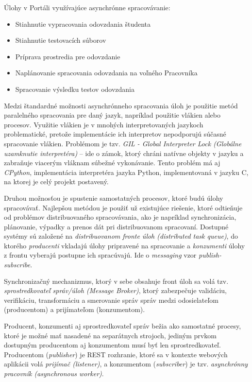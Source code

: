 \documentclass[
  digital, %
  oneside, %
  table,   %
  lof,     %
  lot,   %
]{fithesis3}
\begin{document}
Úlohy v Portáli využívajúce asynchrónne spracovávanie:

\begin{itemize}
    \item Stiahnutie vypracovania odovzdania študenta
    \item Stiahnutie testovacích súborov
    \item Príprava prostredia pre odovzdanie
    \item Naplánovanie spracovania odovzdania na voľného Pracovníka
    \item Spracovanie výsledku testov odovzdania
\end{itemize}

Medzi štandardné možnosti asynchrónneho spracovania úloh je použitie metód paralelného spracovania pre daný jazyk, napríklad použitie vlákien alebo procesov. Využitie vlákien je v mnohých interpretovaných jazykoch problematické, pretože implementácie ich interpretov nepodporujú súčasné spracovanie vlákien. Problémom je tzv. \emph{GIL - Global Interpreter Lock (Globálne uzamknutie interpretéra)} -- ide o zámok, ktorý chráni natívne objekty v jazyku a zabraňuje viacerým vláknam súbežné vykonávanie. Tento problém má aj \emph{CPython}, implementácia interpretéra jazyka Python, implementovaná v jazyku C, na ktorej je celý projekt postavený\cite{cpython-gil}.

Druhou možnosťou je spustenie samostatných procesov, ktoré budú úlohy spracovávať. Najlepšou metódou je použiť už existujúce riešenie, ktoré odtieňuje od problémov distribuovaného spracovávania, ako je napríklad synchronizácia, plánovanie, výpadky a prenos dát pri distribuovanom spracovaní. Dostupné systémy sú založené na \emph{distribuovanom fronte úloh (distributed task queue)}, do ktorého \emph{producenti} vkladajú úlohy pripravené na spracovanie a \emph{konzumenti} úlohy z frontu vyberajú postupne ich spracúvajú. Ide o \emph{messaging} vzor \emph{publish-subscribe}\cite{ethomas-soa}.

Synchronizačný mechanizmus, ktorý v sebe obsahuje front úloh sa volá tzv. \emph{sprostredkovateľ správ/úloh (Message Broker)}, ktorý zabezpečuje validáciu, verifikáciu, transformáciu a smerovanie správ správ medzi odosielateľom (producentom) a prijímateľom (konzumentom)\cite{mom}.

Producent, konzumenti aj sprostredkovateľ správ bežia ako samostatné procesy, ktoré je možné mať nasadené na separátnych strojoch, jediným prvkom dostupným producentom aj konzumentom musí byť len sprostredkovateľ. Producentom (\emph{publisher}) je REST rozhranie, ktoré sa v kontexte webových aplikácii volá \emph{prijímač (listener)}, a konzumentom (\emph{subscriber}) je tzv. \emph{asynchrónny pracovník (asynchronous worker)}.
\end{document}

